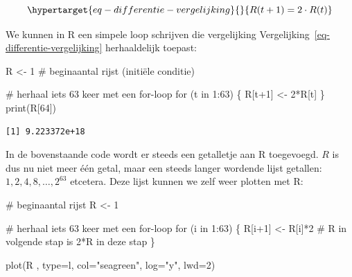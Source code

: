 \documentclass[
  a4paper,
]{scrbook}
\newenvironment{Shaded}{\begin{snugshade}}{\end{snugshade}}
\newcommand{\AttributeTok}[1]{\textcolor[rgb]{0.40,0.45,0.13}{#1}}
\newcommand{\CommentTok}[1]{\textcolor[rgb]{0.37,0.37,0.37}{#1}}
\newcommand{\ControlFlowTok}[1]{\textcolor[rgb]{0.00,0.23,0.31}{#1}}
\newcommand{\DecValTok}[1]{\textcolor[rgb]{0.68,0.00,0.00}{#1}}
\newcommand{\FunctionTok}[1]{\textcolor[rgb]{0.28,0.35,0.67}{#1}}
\newcommand{\NormalTok}[1]{\textcolor[rgb]{0.00,0.23,0.31}{#1}}
\newcommand{\OtherTok}[1]{\textcolor[rgb]{0.00,0.23,0.31}{#1}}
\newcommand{\SpecialCharTok}[1]{\textcolor[rgb]{0.37,0.37,0.37}{#1}}
\newcommand{\StringTok}[1]{\textcolor[rgb]{0.13,0.47,0.30}{#1}}
\theoremstyle{definition}
\theoremstyle{remark}
\begin{document}
\begin{equation}\protect\hypertarget{eq-differentie-vergelijking}{}{
R(t+1) = 2\cdot R(t) 
}\label{eq-differentie-vergelijking}\end{equation}

We kunnen in R een simpele loop schrijven die vergelijking
Vergelijking~\ref{eq-differentie-vergelijking} herhaaldelijk toepast:

\begin{Shaded}
\begin{Highlighting}[]
\NormalTok{R }\OtherTok{\textless{}{-}} \DecValTok{1} \CommentTok{\# beginaantal rijst (initiële conditie)}

\CommentTok{\# herhaal iets 63 keer met een for{-}loop}
\ControlFlowTok{for}\NormalTok{ (t }\ControlFlowTok{in} \DecValTok{1}\SpecialCharTok{:}\DecValTok{63}\NormalTok{) \{}
\NormalTok{  R[t}\SpecialCharTok{+}\DecValTok{1}\NormalTok{] }\OtherTok{\textless{}{-}} \DecValTok{2}\SpecialCharTok{*}\NormalTok{R[t]}
\NormalTok{\}}
\FunctionTok{print}\NormalTok{(R[}\DecValTok{64}\NormalTok{])}
\end{Highlighting}
\end{Shaded}

\begin{verbatim}
[1] 9.223372e+18
\end{verbatim}

In de bovenstaande code wordt er steeds een getalletje aan R toegevoegd.
\(R\) is dus nu niet meer één getal, maar een steeds langer wordende
lijst getallen: \(1, 2, 4, 8, \dots, 2^{63}\) etcetera. Deze lijst
kunnen we zelf weer plotten met R:

\begin{Shaded}
\begin{Highlighting}[]
\CommentTok{\# beginaantal rijst}
\NormalTok{R }\OtherTok{\textless{}{-}} \DecValTok{1}

\CommentTok{\# herhaal iets 63 keer met een for{-}loop}
\ControlFlowTok{for}\NormalTok{ (i }\ControlFlowTok{in} \DecValTok{1}\SpecialCharTok{:}\DecValTok{63}\NormalTok{) \{}
\NormalTok{  R[i}\SpecialCharTok{+}\DecValTok{1}\NormalTok{] }\OtherTok{\textless{}{-}}\NormalTok{ R[i]}\SpecialCharTok{*}\DecValTok{2} \CommentTok{\# R in volgende stap is 2*R in deze stap}
\NormalTok{\}}

\FunctionTok{plot}\NormalTok{(R , }\AttributeTok{type=}\StringTok{\textquotesingle{}l\textquotesingle{}}\NormalTok{, }\AttributeTok{col=}\StringTok{"seagreen"}\NormalTok{, }\AttributeTok{log=}\StringTok{"y"}\NormalTok{, }\AttributeTok{lwd=}\DecValTok{2}\NormalTok{) }
\end{Highlighting}
\end{Shaded}
\end{document}
